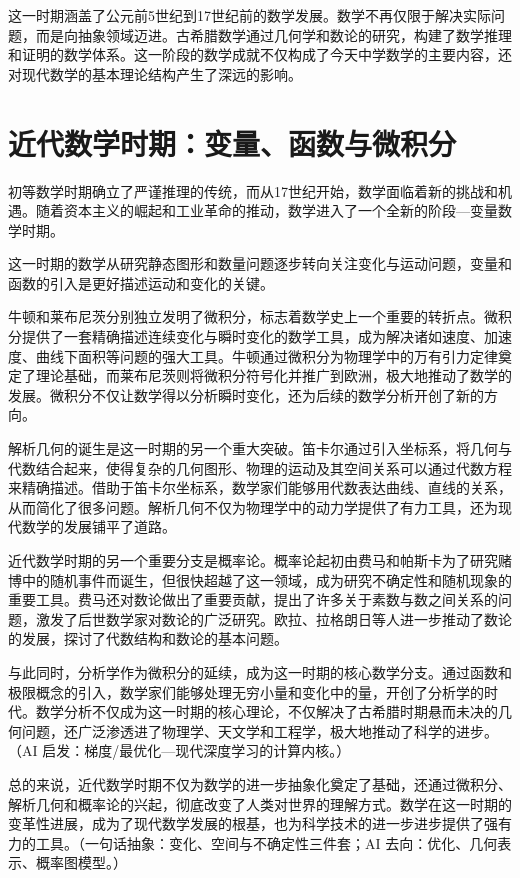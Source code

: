 这一时期涵盖了公元前5世纪到17世纪前的数学发展。数学不再仅限于解决实际问题，而是向抽象领域迈进。古希腊数学通过几何学和数论的研究，构建了数学推理和证明的数学体系。这一阶段的数学成就不仅构成了今天中学数学的主要内容，还对现代数学的基本理论结构产生了深远的影响。


\section{近代数学时期：变量、函数与微积分}

初等数学时期确立了严谨推理的传统，而从17世纪开始，数学面临着新的挑战和机遇。随着资本主义的崛起和工业革命的推动，数学进入了一个全新的阶段---变量数学时期。

这一时期的数学从研究静态图形和数量问题逐步转向关注变化与运动问题，变量和函数的引入是更好描述运动和变化的关键。

牛顿和莱布尼茨分别独立发明了微积分，标志着数学史上一个重要的转折点。微积分提供了一套精确描述连续变化与瞬时变化的数学工具，成为解决诸如速度、加速度、曲线下面积等问题的强大工具。牛顿通过微积分为物理学中的万有引力定律奠定了理论基础，而莱布尼茨则将微积分符号化并推广到欧洲，极大地推动了数学的发展。微积分不仅让数学得以分析瞬时变化，还为后续的数学分析开创了新的方向。

解析几何的诞生是这一时期的另一个重大突破。笛卡尔通过引入坐标系，将几何与代数结合起来，使得复杂的几何图形、物理的运动及其空间关系可以通过代数方程来精确描述。借助于笛卡尔坐标系，数学家们能够用代数表达曲线、直线的关系，从而简化了很多问题。解析几何不仅为物理学中的动力学提供了有力工具，还为现代数学的发展铺平了道路。

近代数学时期的另一个重要分支是概率论。概率论起初由费马和帕斯卡为了研究赌博中的随机事件而诞生，但很快超越了这一领域，成为研究不确定性和随机现象的重要工具。费马还对数论做出了重要贡献，提出了许多关于素数与数之间关系的问题，激发了后世数学家对数论的广泛研究。欧拉、拉格朗日等人进一步推动了数论的发展，探讨了代数结构和数论的基本问题。

与此同时，分析学作为微积分的延续，成为这一时期的核心数学分支。通过函数和极限概念的引入，数学家们能够处理无穷小量和变化中的量，开创了分析学的时代。数学分析不仅成为这一时期的核心理论，不仅解决了古希腊时期悬而未决的几何问题，还广泛渗透进了物理学、天文学和工程学，极大地推动了科学的进步。{（AI 启发：梯度/最优化—现代深度学习的计算内核。）}

总的来说，近代数学时期不仅为数学的进一步抽象化奠定了基础，还通过微积分、解析几何和概率论的兴起，彻底改变了人类对世界的理解方式。数学在这一时期的变革性进展，成为了现代数学发展的根基，也为科学技术的进一步进步提供了强有力的工具。{（一句话抽象：变化、空间与不确定性三件套；AI 去向：优化、几何表示、概率图模型。）}

